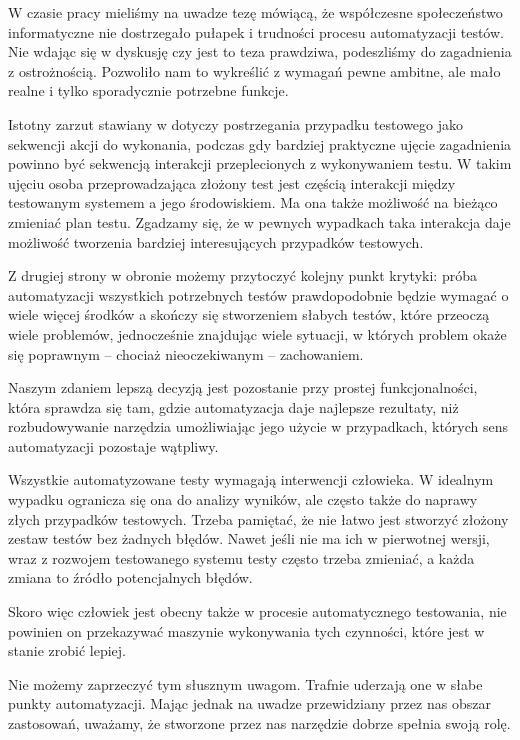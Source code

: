 \documentclass[00-praca-magisterska.tex]{subfiles}
\begin{document}
W czasie pracy mieliśmy na uwadze tezę mówiącą, że współczesne społeczeństwo
informatyczne nie dostrzegało pułapek i trudności procesu automatyzacji testów.
Nie wdając się w dyskusję czy jest to teza prawdziwa, podeszliśmy do
zagadnienia z ostrożnością. Pozwoliło nam to wykreślić z wymagań pewne ambitne,
ale mało realne i tylko sporadycznie potrzebne funkcje.

Istotny zarzut stawiany w \cite{snake-oil} dotyczy postrzegania przypadku
testowego jako sekwencji akcji do wykonania, podczas gdy bardziej praktyczne
ujęcie zagadnienia powinno być sekwencją interakcji przeplecionych z
wykonywaniem testu. W takim ujęciu osoba przeprowadzająca złożony test jest
częścią interakcji między testowanym systemem a jego środowiskiem. Ma ona także
możliwość na bieżąco zmieniać plan testu. Zgadzamy się, że w pewnych wypadkach
taka interakcja daje możliwość tworzenia bardziej interesujących przypadków
testowych. 

Z drugiej strony w obronie możemy przytoczyć kolejny punkt krytyki: próba
automatyzacji wszystkich potrzebnych testów prawdopodobnie będzie wymagać o
wiele więcej środków a skończy się stworzeniem słabych testów, które przeoczą
wiele problemów, jednocześnie znajdując wiele sytuacji, w których problem okaże
się poprawnym -- chociaż nieoczekiwanym -- zachowaniem.

Naszym zdaniem lepszą decyzją jest pozostanie przy prostej funkcjonalności,
która sprawdza się tam, gdzie automatyzacja daje najlepsze rezultaty, niż
rozbudowywanie narzędzia umożliwiając jego użycie w przypadkach, których sens
automatyzacji pozostaje wątpliwy.

Wszystkie automatyzowane testy wymagają interwencji człowieka. W idealnym
wypadku ogranicza się ona do analizy wyników, ale często także do naprawy złych
przypadków testowych. Trzeba pamiętać, że nie łatwo jest stworzyć złożony
zestaw testów bez żadnych błędów. Nawet jeśli nie ma ich w pierwotnej wersji,
wraz z rozwojem testowanego systemu testy często trzeba zmieniać, a każda
zmiana to źródło potencjalnych błędów.

Skoro więc człowiek jest obecny także w procesie automatycznego testowania, nie
powinien on przekazywać maszynie wykonywania tych czynności, które jest w
stanie zrobić lepiej.

Nie możemy zaprzeczyć tym słusznym uwagom. Trafnie uderzają one w słabe punkty
automatyzacji. Mając jednak na uwadze przewidziany przez nas obszar zastosowań,
uważamy, że stworzone przez nas narzędzie dobrze spełnia swoją rolę.
\end{document}
